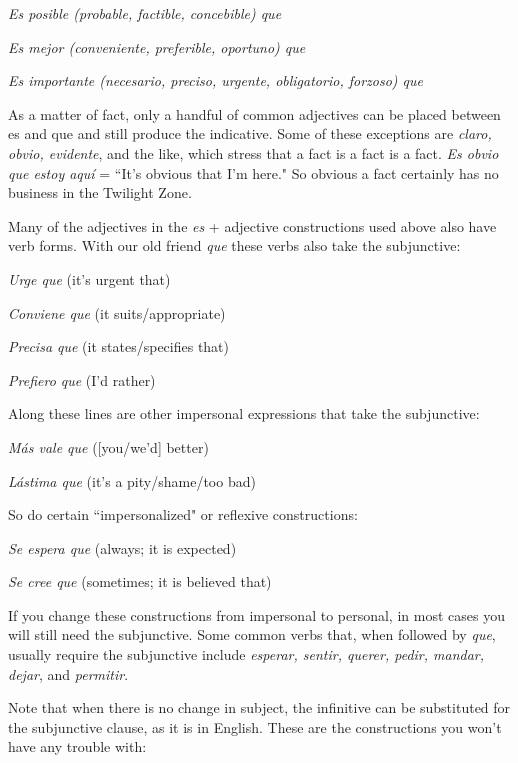 \bsk

\indu \emph{Es posible (probable, factible, concebible) que}

\indu \emph{Es mejor (conveniente, preferible, oportuno) que}

\indu \emph{Es importante (necesario, preciso, urgente, obligatorio,
	forzoso) que}

\bsk

As a matter of fact, only a handful of common adjectives can
be placed between es and que and still produce the indicative. Some of
these exceptions are \emph{claro, obvio, evidente}, and the like, which stress
that a fact is a fact is a fact. \emph{Es obvio que estoy aquí} = ``It's obvious
that I'm here." So obvious a fact certainly has no business in the Twilight Zone.

Many of the adjectives in the \emph{es} + adjective constructions
used above also have verb forms. With our old friend \emph{que} these verbs
also take the subjunctive:

\bsk

\indu \emph{Urge que} (it's urgent that)

\indu \emph{Conviene que} (it suits/appropriate)

\indu \emph{Precisa que} (it states/specifies that)

\indu \emph{Prefiero que} (I'd rather)

\bsk

Along these lines are other impersonal expressions that take
the subjunctive:

\bsk

\indu \emph{Más vale que} ([you/we'd] better)

\indu \emph{Lástima que} (it's a pity/shame/too bad)

\bsk

So do certain ``impersonalized" or reflexive constructions:

\bsk

\indu \emph{Se espera que} (always; it is expected)

\indu \emph{Se cree que} (sometimes; it is believed that)

\bsk

If you change these constructions from impersonal to personal, in
most cases you will still need the subjunctive. Some common verbs
that, when followed by \emph{que}, usually require the subjunctive include
\emph{esperar, sentir, querer, pedir, mandar, dejar}, and \emph{permitir}.

Note that when there is no change in subject, the infinitive
can be substituted for the subjunctive clause, as it is in English. These
are the constructions you won't have any trouble with:

